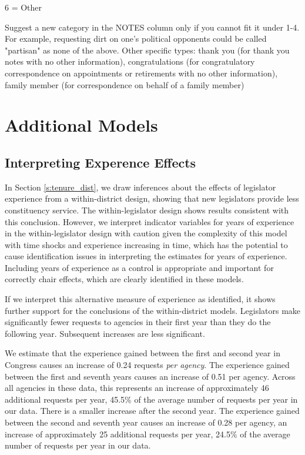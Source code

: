 6 = Other \\

\hfill\begin{minipage}{\dimexpr\textwidth-2cm}
	Suggest a new category in the NOTES column only if you cannot fit it under 1-4. For example, requesting dirt on one's political opponents could be called "partisan" as none of the above. Other specific types: thank you (for thank you notes with no other information), congratulations (for congratulatory correspondence on appointments or retirements with no other information), family member (for correspondence on behalf of a family member) \\
\end{minipage}

\clearpage


\section{Additional Models} \label{s:appendix_models}

\subsection{Interpreting Experence Effects }

In Section \ref{s:tenure_dist}, we draw inferences about the effects of legislator experience from a within-district design, showing that new legislators provide less constituency service. The within-legislator design shows results consistent with this conclusion. However, we interpret indicator variables for years of experience in the within-legislator design with caution given the complexity of this model with time shocks and experience increasing in time, which has the potential to cause identification issues in interpreting the estimates for years of experience. Including years of experience as a control is appropriate and important for correctly chair effects, which are clearly identified in these models.  

If we interpret this alternative measure of experience as identified, it shows further support for the conclusions of the within-district models. Legislators make significantly fewer requests to agencies in their first year than they do the following year. Subsequent increases are less significant.  

We estimate that the experience gained between the first and second year in Congress causes an increase of 0.24 requests \textit{per agency}. The experience gained between the first and seventh years causes an increase of 0.51 per agency. Across all  agencies in these data, this represents an increase of approximately 46 additional requests per year, 45.5\% of the average number of requests per year in our data. There is a smaller increase after the second year. The experience gained between the second and seventh year causes an increase of 0.28 per agency, an increase of approximately 25 additional requests per year, 24.5\% of the average number of requests per year in our data.

